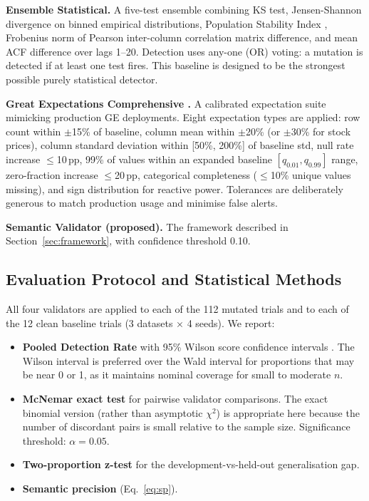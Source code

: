 \documentclass[journal]{IEEEtran}
\begin{document}
\textbf{Ensemble Statistical.}  A five-test ensemble combining KS test,
Jensen-Shannon divergence \cite{lin1991jsd} on binned empirical
distributions, Population Stability Index \cite{yurdakul2018psi}, Frobenius
norm of Pearson inter-column correlation matrix difference, and mean ACF
difference over lags 1--20.  Detection uses any-one (OR) voting: a mutation
is detected if at least one test fires.  This baseline is designed to be the
strongest possible purely statistical detector.

\textbf{Great Expectations Comprehensive \cite{greatexpectations2023}.}  A
calibrated expectation suite mimicking production GE deployments.
Eight expectation types are applied: row count within $\pm$15\% of
baseline, column mean within $\pm$20\% (or $\pm$30\% for stock prices),
column standard deviation within [50\%, 200\%] of baseline std, null rate
increase $\leq$10\,pp, 99\% of values within an expanded baseline
$[q_{0.01}, q_{0.99}]$ range, zero-fraction increase $\leq$20\,pp,
categorical completeness ($\leq$10\% unique values missing), and sign
distribution for reactive power.  Tolerances are deliberately generous to
match production usage and minimise false alerts.

\textbf{Semantic Validator (proposed).}  The framework described in
Section~\ref{sec:framework}, with confidence threshold 0.10.

\subsection{Evaluation Protocol and Statistical Methods}

All four validators are applied to each of the 112 mutated trials and to
each of the 12 clean baseline trials (3 datasets $\times$ 4 seeds).
We report:

\begin{itemize}
\item \textbf{Pooled Detection Rate} with 95\% Wilson score confidence
      intervals \cite{wilson1927}.  The Wilson interval is preferred over
      the Wald interval for proportions that may be near 0 or 1, as it
      maintains nominal coverage for small to moderate $n$.

\item \textbf{McNemar exact test} \cite{mcnemar1947} for pairwise validator
      comparisons.  The exact binomial version (rather than asymptotic
      $\chi^2$) is appropriate here because the number of discordant pairs
      is small relative to the sample size.  Significance threshold:
      $\alpha = 0.05$.

\item \textbf{Two-proportion z-test} for the development-vs-held-out
      generalisation gap.

\item \textbf{Semantic precision} (Eq.~\ref{eq:sp}).
\end{itemize}
\end{document}
